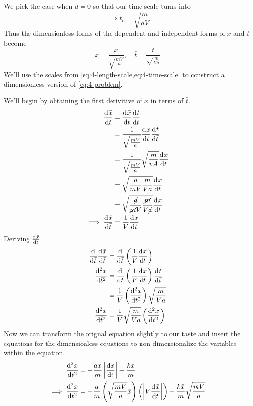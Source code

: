 \documentclass[12pt]{article}
\begin{document}
We pick the case when $d=0$ so that our time scale turns into
\begin{equation}
  \label{eq:4-time-scale}
  \implies t_c = \sqrt{\frac{m}{aV}}
\end{equation}
Thus the dimensionless forms of the dependent and independent forms of $x$ and
$t$ become
\begin{equation}
  \bar{x} = \frac{x}{\sqrt{\frac{mV}{a}}}, \quad
  \bar{t} = \frac{t}{\sqrt{\frac{m}{Va}}}
\end{equation}
We'll use the scales from \cref{eq:4-length-scale,eq:4-time-scale} to construct
a dimensionless version of \cref{eq:4-problem}.

We'll begin by obtaining the first derivitive of $\bar{x}$ in terms of
$\bar{t}$.
\begin{equation}
  \begin{aligned}
    \od{\bar{x}}{\bar{t}} &= \od{\bar{x}}{t}\od{t}{\bar{t}} \\
    &= \frac{1}{\sqrt{\frac{mV}{a}}}\od{x}{t}\od{t}{\bar{t}} \\
    &= \frac{1}{\sqrt{\frac{mV}{a}}}\sqrt{\frac{m}{vA}}\od{x}{t} \\
    &= \sqrt{\frac{a}{mV}\frac{m}{Va}} \od{x}{t} \\
    &= \sqrt{\frac{\cancel{a}}{\cancel{m}V}\frac{\cancel{m}}{V\cancel{a}}}
    \od{x}{t} \\
    \implies \od{\bar{x}}{\bar{t}} &= \frac{1}{V}\od{x}{t} \\
  \end{aligned}
\end{equation}
Deriving $\od{\bar{x}}{\bar{t}}$
\begin{equation}
  \begin{aligned}
    \od{}{\bar{t}}\od{\bar{x}}{\bar{t}} &= \od{}{\bar{t}} \left(\frac{1}{V}\od{x}{t}\right) \\
    \od[2]{\bar{x}}{\bar{t}} &= \od{}{t}
    \left(\frac{1}{V}\od{x}{t}\right) \od{t}{\bar{t}} \\
    &= \frac{1}{V} \left(\od[2]{x}{t}\right) \sqrt{\frac{m}{Va}} \\
    \od[2]{\bar{x}}{\bar{t}} &= \frac{1}{V}\sqrt{\frac{m}{Va}} \left(\od[2]{x}{t}\right) \\
  \end{aligned}
\end{equation}
Now we can transform the orignal equation slightly to our
taste and insert the equations for the dimensionless equations to
non-dimensionalize the variables within the equation.
\begin{equation}
  \label{eq:4-equation}
  \begin{aligned}
    \od[2]{x}{t} &= -\frac{ax}{m} \abs{\od{x}{t}} - \frac{kx}{m} \\
    \implies \od[2]{x}{t} &= -\frac{a}{m}\left( \sqrt{\frac{mV}{a}}\bar{x}\right)
    \left( \abs{V\od{\bar{x}}{\bar{t}}}\right) -
    \frac{k\bar{x}}{m}\sqrt{\frac{mV}{a}} \\
  \end{aligned}
\end{equation}
\end{document}
